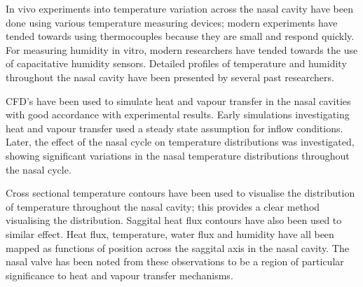In vivo experiments into temperature variation across the nasal cavity have been done using various temperature measuring devices; modern experiments have tended towards using thermocouples because they are small and respond quickly\cite{Elad2008}. For measuring humidity in vitro, modern researchers have tended towards the use of capacitative humidity sensors\cite{Keck2000}. Detailed profiles of temperature and humidity throughout the nasal cavity have been presented by several past researchers\cite{Keck2000}.

CFD's have been used to simulate heat and vapour transfer in the nasal cavities with good accordance with experimental results\cite{Lindemann2004}. Early simulations investigating heat and vapour transfer used a steady state assumption for inflow conditions\cite{Naftali1998}. Later, the effect of the nasal cycle on temperature distributions was investigated, showing significant variations in the nasal temperature distributions throughout the nasal cycle\cite{Elad2006}.

Cross sectional temperature contours have been used to visualise the distribution of temperature throughout the nasal cavity; this provides a clear method visualising the distribution\cite{Naftali2005}. Saggital heat flux contours have also been used to similar effect\cite{Sullivan2013}. Heat flux, temperature, water flux and humidity have all been mapped as functions of position across the saggital axis in the nasal cavity\cite{Garcia2007, Sullivan2013, Yu2014}. The nasal valve has been noted from these observations to be a region of particular significance to heat and vapour transfer mechanisms\cite{Sullivan2013}. 




%
%
%
%
%
%
%
%
%
%
%
%
%
%
%
%
%
%



